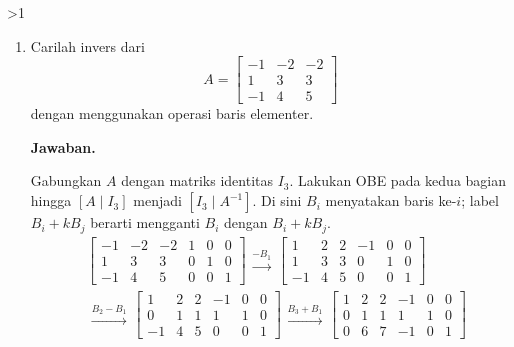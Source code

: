 \documentclass[12pt]{article}
\newcommand{\answername}{Jawaban}
\newenvironment{soaljawab}[1]{%
    \ifnum#1>1\clearpage\fi
    \begin{tcolorbox}[enhanced,breakable,height fill,height fixed for=all,
        sharp corners,colback=white,colframe=black,boxrule=0.4bp,
        boxsep=0pt,left=12bp,right=12bp,top=6bp,bottom=10bp,
        before skip=0pt,after skip=0pt,pad at break=8bp]
    \fontsize{12bp}{14bp}\selectfont
    \setlength{\abovedisplayskip}{8bp}
    \setlength{\belowdisplayskip}{8bp}
    \setlength{\abovedisplayshortskip}{8bp}
    \setlength{\belowdisplayshortskip}{8bp}
    \renewcommand{\arraystretch}{1.15}
    \begin{enumerate}[start=#1,topsep=0pt]
}{%
    \end{enumerate}
    \end{tcolorbox}
}
\newcommand{\jawaban}{\par\medskip\textbf{\answername.}\par\smallskip}
\begin{document}
\begin{soaljawab}{5}
\item Carilah invers dari
        \[
          A = \begin{bmatrix}
            -1 & -2 & -2 \\
            1  & 3  & 3  \\
            -1 & 4  & 5
          \end{bmatrix}
        \]
        dengan menggunakan operasi baris elementer.
\jawaban
Gabungkan $A$ dengan matriks identitas $I_3$. Lakukan OBE pada
kedua bagian hingga $[A\mid I_3]$ menjadi $[I_3\mid A^{-1}]$.
Di sini $B_i$ menyatakan baris ke-$i$; label $B_i+kB_j$ berarti
mengganti $B_i$ dengan $B_i+kB_j$.
{\setlength{\arraycolsep}{4bp}
\begin{align*}
    & \left[\begin{array}{ccc|ccc}
            -1 & -2 & -2 & 1 & 0 & 0 \\
            1 & 3 & 3 & 0 & 1 & 0 \\
            -1 & 4 & 5 & 0 & 0 & 1
        \end{array}\right]
        \begin{array}{c}\xrightarrow{-B_1}\end{array}
        \left[\begin{array}{ccc|ccc}
            1 & 2 & 2 & -1 & 0 & 0 \\
            1 & 3 & 3 & 0 & 1 & 0 \\
            -1 & 4 & 5 & 0 & 0 & 1
        \end{array}\right] \\[6bp]
    & \begin{array}{c}\xrightarrow{B_2-B_1}\end{array}
        \left[\begin{array}{ccc|ccc}
            1 & 2 & 2 & -1 & 0 & 0 \\
            0 & 1 & 1 & 1 & 1 & 0 \\
            -1 & 4 & 5 & 0 & 0 & 1
        \end{array}\right]
        \begin{array}{c}\xrightarrow{B_3+B_1}\end{array}
        \left[\begin{array}{ccc|ccc}
            1 & 2 & 2 & -1 & 0 & 0 \\
            0 & 1 & 1 & 1 & 1 & 0 \\
            0 & 6 & 7 & -1 & 0 & 1
        \end{array}\right] \\[6bp]

\end{align*}}
\end{soaljawab}
\end{document}
